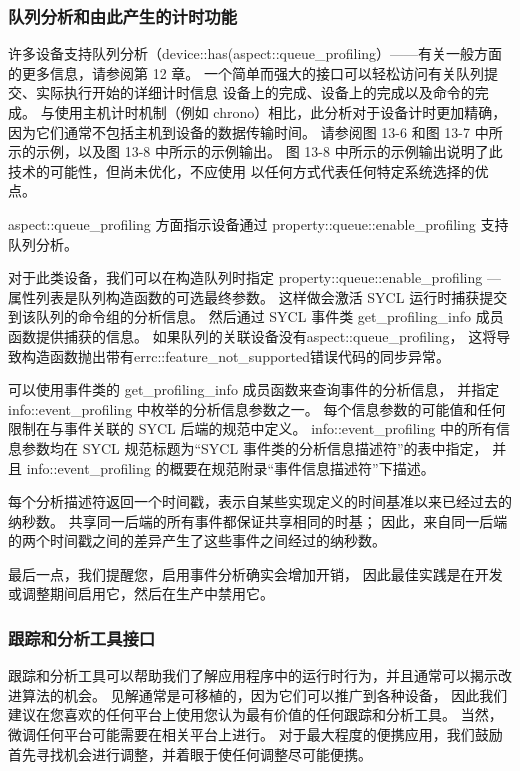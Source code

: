 \subsubsection{队列分析和由此产生的计时功能}
许多设备支持队列分析（device::has(aspect::queue\_profiling）——有关一般方面的更多信息，请参阅第 12 章。
一个简单而强大的接口可以轻松访问有关队列提交、实际执行开始的详细计时信息 设备上的完成、设备上的完成以及命令的完成。
与使用主机计时机制（例如 chrono）相比，此分析对于设备计时更加精确，因为它们通常不包括主机到设备的数据传输时间。 
请参阅图 13-6 和图 13-7 中所示的示例，以及图 13-8 中所示的示例输出。
图 13-8 中所示的示例输出说明了此技术的可能性，但尚未优化，不应使用 以任何方式代表任何特定系统选择的优点。

aspect::queue\_profiling 方面指示设备通过 property::queue::enable\_profiling 支持队列分析。

对于此类设备，我们可以在构造队列时指定 property::queue::enable\_profiling — 
属性列表是队列构造函数的可选最终参数。 这样做会激活 SYCL 运行时捕获提交到该队列的命令组的分析信息。 
然后通过 SYCL 事件类 get\_profiling\_info 成员函数提供捕获的信息。 
如果队列的关联设备没有aspect::queue\_profiling，
这将导致构造函数抛出带有errc::feature\_not\_supported错误代码的同步异常。

可以使用事件类的 get\_profiling\_info 成员函数来查询事件的分析信息，
并指定 info::event\_profiling 中枚举的分析信息参数之一。 
每个信息参数的可能值和任何限制在与事件关联的 SYCL 后端的规范中定义。 
info::event\_profiling 中的所有信息参数均在 SYCL 规范标题为“SYCL 事件类的分析信息描述符”的表中指定，
并且 info::event\_profiling 的概要在规范附录“事件信息描述符”下描述。

每个分析描述符返回一个时间戳，表示自某些实现定义的时间基准以来已经过去的纳秒数。 
共享同一后端的所有事件都保证共享相同的时基； 
因此，来自同一后端的两个时间戳之间的差异产生了这些事件之间经过的纳秒数。

最后一点，我们提醒您，启用事件分析确实会增加开销，
因此最佳实践是在开发或调整期间启用它，然后在生产中禁用它。

\subsubsection{跟踪和分析工具接口}
跟踪和分析工具可以帮助我们了解应用程序中的运行时行为，并且通常可以揭示改进算法的机会。 
见解通常是可移植的，因为它们可以推广到各种设备，
因此我们建议在您喜欢的任何平台上使用您认为最有价值的任何跟踪和分析工具。 
当然，微调任何平台可能需要在相关平台上进行。 
对于最大程度的便携应用，我们鼓励首先寻找机会进行调整，并着眼于使任何调整尽可能便携。

